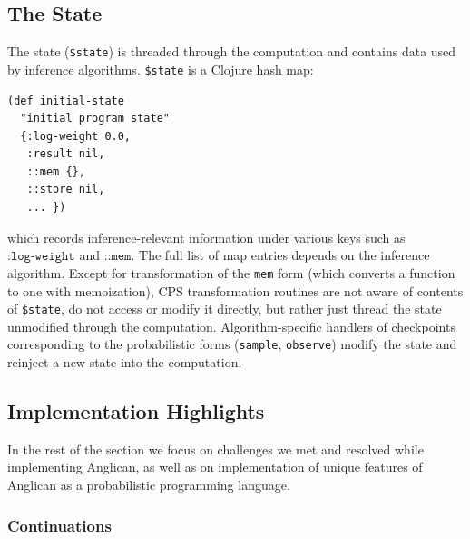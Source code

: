 \documentclass[preprint]{sigplanconf}
\begin{document}
\subsection {The State}
\label{sec:state}

The state (\texttt{\$state}) is threaded through the computation
and contains data used by inference algorithms. \texttt{\$state}
is a Clojure hash map:
\begin{lstlisting}[style=default]
(def initial-state
  "initial program state"
  {:log-weight 0.0,
   :result nil,
   ::mem {},
   ::store nil,
   ... })
\end{lstlisting}
which records inference-relevant information under various keys
such as $\texttt{:log-weight}$ and $\texttt{::mem}$.
The full list of map entries depends on the inference
algorithm. Except for transformation of
the \texttt{mem} form (which converts a function to one with memoization), 
CPS transformation routines
are not aware of contents of \texttt{\$state}, do not access or
modify it directly, but rather just thread the state unmodified
through the computation. Algorithm-specific handlers of
checkpoints corresponding to the probabilistic forms
(\texttt{sample}, \texttt{observe}) modify the
state and reinject a new state into the computation.

\iftoggle{full}{%

}{%
}%

\subsection{Implementation Highlights}
\label{seq:highlights}

\iftoggle{full}{%
So far we introduced the basics of Anglican compilation to
Clojure. The described approaches and techniques are important
for grasping the language implementation but relatively well-known.
}{%
Anglican compilation to Clojure is based on CPS transformation
and compilation techniques, many of which are
well known and widely used~\cite{AJ89,A07}.
}%
In the rest of the section we focus on challenges we met and
resolved while implementing Anglican, as well as on
implementation of unique features of Anglican as a probabilistic
programming language.

\subsubsection{Continuations}
\label{seq:continuations}
\end{document}
